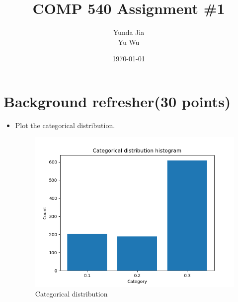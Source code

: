 \documentclass{article}
\title{COMP 540 Assignment \#1}
\author{Yunda Jia\\Yu Wu}
\date{\today}
\begin{document}
\maketitle

\section{Background refresher(30 points)}
\begin{itemize}
	\item Plot the categorical distribution.\\
\begin{figure}[h!]
	\centering
	\includegraphics[scale = 0.5]{Categorical_distribution.png}
	\caption{Categorical distribution}
\end{figure}


\end{itemize}
\end{document}
